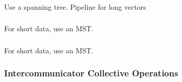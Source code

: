 \documentclass{article}
\begin{document}
\subsubsection{}
Use a spanning tree.  Pipeline for long vectors

\subsubsection{}
For short data, use an MST. 

\subsubsection{}
For short data, use an MST. 

\subsubsection{Intercommunicator Collective Operations}
\subsubsection{}
\subsubsection{}
\subsubsection{}
\subsubsection{}
\subsubsection{}
\subsubsection{}
\subsubsection{}
\subsubsection{}
\end{document}
